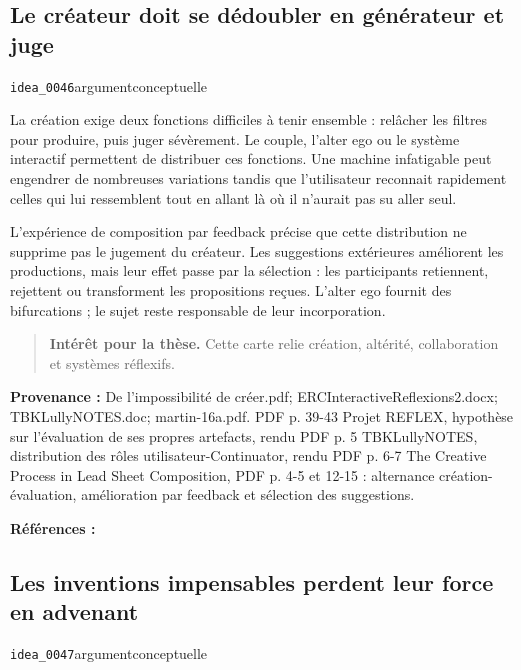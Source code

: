 \documentclass[10pt,a4paper]{article}
\begin{document}
\subsection{Le créateur doit se dédoubler en générateur et juge}
{\small\color{metadata} \texttt{idea\_0046}\quad\textbullet\quad argument\quad\textbullet\quad conceptuelle\par}

La création exige deux fonctions difficiles à tenir ensemble : relâcher les filtres pour produire, puis juger sévèrement. Le couple, l'alter ego ou le système interactif permettent de distribuer ces fonctions. Une machine infatigable peut engendrer de nombreuses variations tandis que l'utilisateur reconnait rapidement celles qui lui ressemblent tout en allant là où il n'aurait pas su aller seul.

L'expérience de composition par feedback précise que cette distribution ne supprime pas le jugement du créateur. Les suggestions extérieures améliorent les productions, mais leur effet passe par la sélection : les participants retiennent, rejettent ou transforment les propositions reçues. L'alter ego fournit des bifurcations ; le sujet reste responsable de leur incorporation.

\begin{quote}
\textbf{Intérêt pour la thèse.} Cette carte relie création, altérité, collaboration et systèmes réflexifs.
\end{quote}
{\footnotesize\color{metadata}\textbf{Provenance :} De l'impossibilité de créer.pdf; ERCInteractiveReflexions2.docx; TBKLullyNOTES.doc; martin-16a.pdf. PDF p. 39-43 Projet REFLEX, hypothèse sur l'évaluation de ses propres artefacts, rendu PDF p. 5 TBKLullyNOTES, distribution des rôles utilisateur-Continuator, rendu PDF p. 6-7 The Creative Process in Lead Sheet Composition, PDF p. 4-5 et 12-15 : alternance création-évaluation, amélioration par feedback et sélection des suggestions.\par}
{\footnotesize\color{metadata}\textbf{Références :} \parencite{martin2016creativeprocess}\par}

\subsection{Les inventions impensables perdent leur force en advenant}
{\small\color{metadata} \texttt{idea\_0047}\quad\textbullet\quad argument\quad\textbullet\quad conceptuelle\par}
\end{document}
